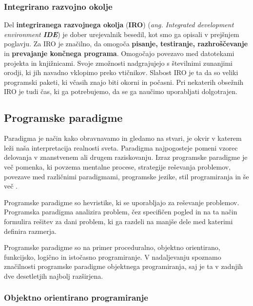 \subsubsection{Integrirano razvojno okolje}
\label{sec:integrirano-raz-okolje}

Del \textbf{integriranega razvojnega okolja} (\textbf{IRO})
(\emph{ang. Integrated development environment \textbf{IDE}}) je dober
urejevalnik besedil, kot smo ga opisali v prejšnjem poglavju. Za IRO
je značilno, da omogoča \textbf{pisanje, testiranje, razhroščevanje}
in \textbf{prevajanje končnega programa}. Omogočajo povezavo med
datotekami projekta in knjižnicami. Svoje zmožnosti nadgrajujejo s
številnimi zunanjimi orodji, ki jih navadno vklopimo preko
vtičnikov. Slabost IRO je ta da so veliki programski paketi, ki včasih
znajo biti okorni in počasni. Pri nekaterih obsežnih IRO je tudi čas,
ki ga potrebujemo, da se ga naučimo uporabljati dolgotrajen.

\subsection{Programske paradigme}
\label{sec:programske_paradigme}

Paradigma je način kako obravnavamo in gledamo na stvari, je okvir v
katerem leži naša interpretacija realnosti sveta. Paradigma
najpogosteje pomeni vzorec delovanja v znanstvenem ali drugem
raziskovanju.  Izraz programske paradigme je več pomenka, ki povzema
mentalne procese, strategije reševanja problemov, povezave med
različnimi paradigmami, programske jezike, stil programiranja in še
več \cite{wiki:paradigme} \cite{guideTCS}.

Programske paradigme so hevristike, ki se uporabljajo za reševanje
problemov. Programska paradigma analizira problem, čez specifičen
pogled in na ta način formulira rešitev za dani problem, ki ga razdeli
na manjše dele med katerimi definira razmerja.

Programske paradigme so na primer proceduralno, objektno orientirano,
funkcijsko, logično in istočasno programiranje. V nadaljevanju
spoznamo značilnosti programske paradigme objektnega programiranja,
saj je ta v zadnjih dve desetletjih najbolj razširjena. 

\subsubsection{Objektno orientirano programiranje}
\label{sec:objektno_orijentirano_programiranje}

